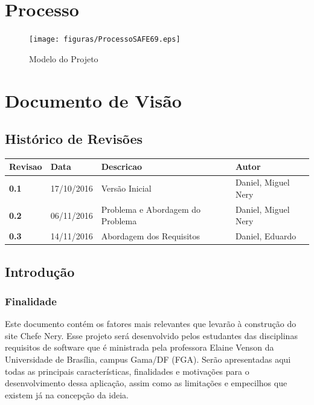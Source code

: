 \begin{apendicesenv}

\partapendices

\chapter{Processo}
\label{Processo}

\begin{figure}[h]
  \centering
  \label{fig01}
    \texttt{[image: figuras/ProcessoSAFE69.eps]}
  \caption{Modelo do Projeto}
\end{figure}

\chapter{Documento de Visão}
\label{Visao}

{\large {\section { Histórico de Revisões \\ } } }


\begin{tabular}{|l|l|l|l|}
  \hline
  \textbf{Revisao} & Data &  Descricao &  Autor \\ \hline
  \textbf{0.1} &  17/10/2016 &  Versão Inicial &  Daniel, Miguel Nery \\ \hline
  \textbf{0.2} &  06/11/2016 &  Problema e Abordagem do Problema &  Daniel, Miguel Nery \\ \hline
  \textbf{0.3} &  14/11/2016 &  Abordagem dos Requisitos & Daniel, Eduardo \\ \hline
\end{tabular}

{\large {\section { Introdução \\ } } }

{\subsection {Finalidade\\ }}
Este documento contém os fatores mais relevantes que levarão à construção do site Chefe Nery. Esse projeto será desenvolvido pelos estudantes das disciplinas requisitos de software que é ministrada pela professora Elaine Venson da Universidade de Brasília, campus Gama/DF (FGA). Serão apresentadas aqui todas as principais características, finalidades e motivações para o desenvolvimento dessa aplicação, assim como as limitações e empecilhos que existem já na concepção da ideia.
\\


\end{apendicesenv}
